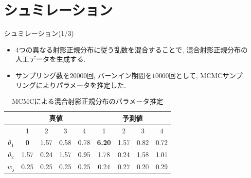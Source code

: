 \documentclass[dvipdfmx]{beamer} %
\begin{document}
\section{シュミレーション}
\begin{frame}{シュミレーション(1/3)}

\begin{itemize}
\item
$4$つの異なる射影正規分布に従う乱数を混合することで, 混合射影正規分布の人工データを生成する.

\vspace{0.2cm}
\item
サンプリング数を$20000$回, バーンイン期間を$10000$回として, MCMCサンプリングによりパラメータを推定した.

\end{itemize}

\begin{table}[tbp]
\begin{center}
\caption{MCMCによる混合射影正規分布のパラメータ推定}
\label{cross1}
\begin{tabular}{c|c c c c|c c c c}
\hline
  & \multicolumn{4}{c}{真値} & \multicolumn{4}{c}{予測値}\\ \hline
  & 1 & 2 & 3 & 4 & 1 & 2 & 3 & 4 \\ \hline 
$\theta_1$ & \textbf{0} & 1.57 & 0.58 & 0.78 & \textbf{6.20} & 1.57 & 0.82 & 0.72 \\ 
$\theta_2$ & 1.57 & 0.24 & 1.57 & 0.95 & 1.78 & 0.24 & 1.58 & 1.01\\
$w_j$ & 0.25 & 0.25 & 0.25 & 0.25 & 0.24 & 0.27 & 0.20 & 0.29\\
\hline
\end{tabular}
\end{center}
\end{table}

\end{frame}
\end{document}
